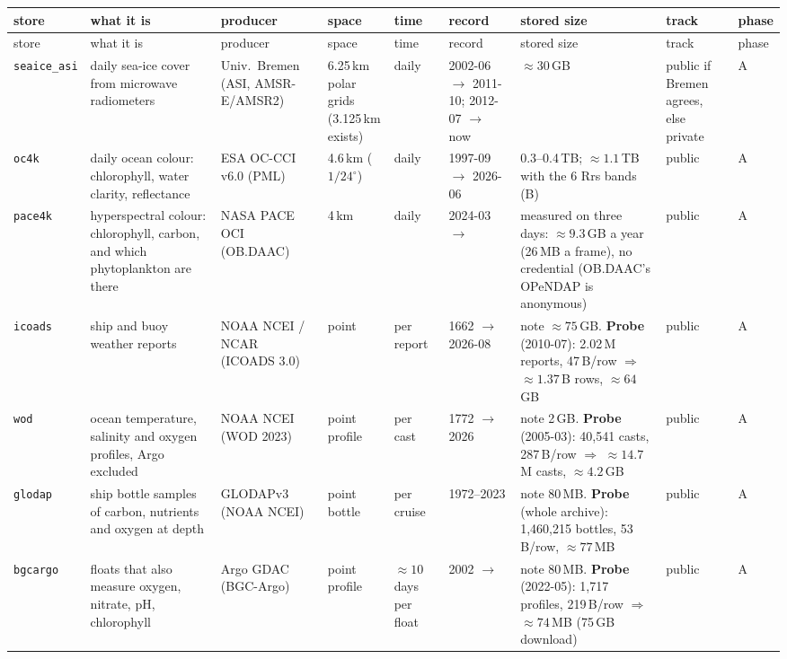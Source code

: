 \documentclass[10pt]{article}
\newcommand{\code}[1]{\texttt{#1}}
\begin{document}
\vspace{-4pt}
{\setlength{\tabcolsep}{2pt}\scriptsize
\begin{longtable}{@{}L{1.65cm}L{2.9cm}L{2.2cm}L{1.7cm}L{1.75cm}L{1.95cm}L{2.75cm}L{1.25cm}L{0.65cm}@{}}
\toprule
store & what it is & producer & space & time & record & stored size & track & phase \\
\midrule
\endfirsthead
\toprule
store & what it is & producer & space & time & record & stored size & track & phase \\
\midrule
\endhead
\code{seaice\_asi} & daily sea-ice cover from microwave radiometers & Univ.\ Bremen (ASI, AMSR-E/AMSR2) & 6.25\,km polar grids (3.125\,km exists) & daily & 2002-06 $\to$ 2011-10; 2012-07 $\to$ now & $\approx 30$\,GB & public if Bremen agrees, else private & A \\
\code{oc4k} & daily ocean colour: chlorophyll, water clarity, reflectance & ESA OC-CCI v6.0 (PML) & 4.6\,km ($1/24^\circ$) & daily & 1997-09 $\to$ 2026-06 & 0.3--0.4\,TB; $\approx 1.1$\,TB with the 6 Rrs bands (B) & public & A \\
\code{pace4k} & hyperspectral colour: chlorophyll, carbon, and which phytoplankton are there & NASA PACE OCI (OB.DAAC) & 4\,km & daily & 2024-03 $\to$ & measured on three days: $\approx 9.3$\,GB a year (26\,MB a frame), no credential (OB.DAAC's OPeNDAP is anonymous) & public & A \\
\code{icoads} & ship and buoy weather reports & NOAA NCEI / NCAR (ICOADS 3.0) & point & per report & 1662 $\to$ 2026-08 & note $\approx 75$\,GB. \textbf{Probe} (2010-07): 2.02\,M reports, 47\,B/row $\Rightarrow$ $\approx 1.37$\,B rows, $\approx 64$\,GB & public & A \\
\code{wod} & ocean temperature, salinity and oxygen profiles, Argo excluded & NOAA NCEI (WOD 2023) & point profile & per cast & 1772 $\to$ 2026 & note 2\,GB. \textbf{Probe} (2005-03): 40,541 casts, 287\,B/row $\Rightarrow$ $\approx 14.7$\,M casts, $\approx 4.2$\,GB & public & A \\
\code{glodap} & ship bottle samples of carbon, nutrients and oxygen at depth & GLODAPv3 (NOAA NCEI) & point bottle & per cruise & 1972--2023 & note 80\,MB. \textbf{Probe} (whole archive): 1,460,215 bottles, 53\,B/row, $\approx 77$\,MB & public & A \\
\code{bgcargo} & floats that also measure oxygen, nitrate, pH, chlorophyll & Argo GDAC (BGC-Argo) & point profile & $\approx 10$ days per float & 2002 $\to$ & note 80\,MB. \textbf{Probe} (2022-05): 1,717 profiles, 219\,B/row $\Rightarrow$ $\approx 74$\,MB (75\,GB download) & public & A \\

\end{longtable}}
\end{document}
